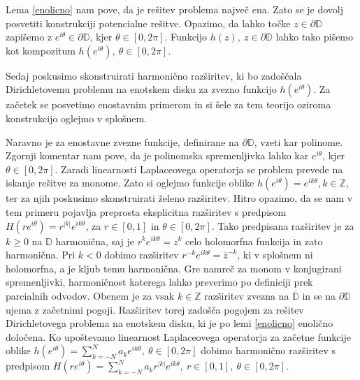 \documentclass[mat1, tisk]{fmfdelo}
\begin{document}
    Lema \ref{enolicno} nam pove, da je rešitev problema največ ena. Zato se je dovolj posvetiti konstrukciji potencialne rešitve. 
    Opazimo, da lahko točke $z \in \partial \mathbb{D}$ zapišemo z \mbox{$e^{i \theta} \in \partial \mathbb{D}$}, kjer $\theta \in [0,2\pi]$. Funkcijo $h(z),~z \in \partial \mathbb{D}$ lahko tako pišemo kot kompozitum $h(e^{i \theta}),~\theta \in [0,2\pi]$.

    Sedaj poskusimo skonstruirati harmonično razširitev, ki bo zadoščala Dirichletovemu problemu na enotskem disku za zvezno funkcijo $h(e^{i \theta})$.
    Za začetek se posvetimo enostavnim primerom in si šele za tem teorijo oziroma konstrukcijo oglejmo v splošnem. 
    
    Naravno je za enostavne zvezne funkcije, definirane na $\partial \mathbb{D}$, vzeti kar polinome. Zgornji komentar nam pove, da je polinomska spremenljivka lahko kar $e^{i\theta}$, kjer \mbox{$\theta \in [0,2\pi]$}. 
    Zaradi linearnosti Laplaceovega operatorja se problem prevede na iskanje rešitve za monome. 
    Zato si oglejmo funkcije oblike $h(e^{i \theta}) = e^{i k \theta}, k \in \mathbb{Z}$, ter za njih poskusimo skonstruirati želeno razširitev. 
    Hitro opazimo, da se nam v tem primeru pojavlja preprosta eksplicitna razširitev s predpisom $H(r e^{i \theta}) = r^{|k|}e^{i k \theta}$, za \mbox{$r \in [0, 1]$} in $\theta \in [0, 2\pi]$. 
    Tako predpisana razširitev je za $k \geq 0$ na $\mathbb{D}$ harmonična, saj je $r^k e^{ik\theta} = z^k$ celo holomorfna funkcija in zato harmonična. Pri $k < 0$ dobimo razširitev $r^{-k} e^{ik\theta} = \overline{z}^{-k}$, ki v splošnem ni holomorfna, a je \mbox{kljub} temu harmonična. 
    Gre namreč za monom v konjugirani spremenljivki, harmoničnost katerega lahko preverimo po definiciji prek parcialnih odvodov.
    Obenem je za vsak $k \in \mathbb{Z}$ razširitev zvezna na $\overline{\mathbb{D}}$ in se na $\partial \mathbb{D}$ ujema z začetnimi pogoji. Razširitev torej zadošča pogojem za rešitev Dirichletovega problema na enotskem disku, ki je po lemi \ref{enolicno} enolično določena. 
    Ko upoštevamo linearnost Laplaceovega operatorja za začetne funkcije oblike $h(e^{i\theta}) = \sum_{k = -N}^{N}{a_k e^{ik\theta}},~\theta \in [0,2\pi]$ dobimo harmonično razširitev s predpisom
    $H(r e^{i \theta}) = \sum_{k = -N}^{N}{a_k r^{|k|}e^{ik\theta}},~r \in [0,1],~\theta \in [0,2\pi]$. 
    
\end{document}
